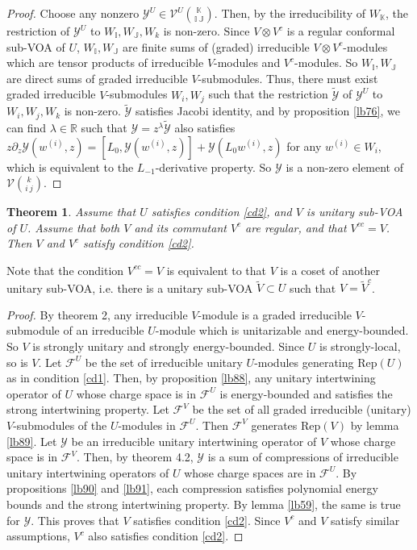 \documentclass[12pt,a4paper]{article}
\theoremstyle{definition}
\theoremstyle{plain}
\newtheorem{thm}[df]{Theorem}
\newcommand{\mc}{\mathcal}
\newcommand{\wtd}{\widetilde}
\newcommand{\Rep}{\mathrm{Rep}}
\newcommand{\mbb}{\mathbb}
\numberwithin{equation}{subsection}
\begin{document}
\begin{proof}
Choose any nonzero $\mc Y^U\in\mc V^U{\mbb K\choose \mbb I~\mbb J}$. Then, by the irreducibility of $W_{\mbb K}$, the restriction of $\mc Y^U$ to $W_{\mbb I},W_{\mbb J},W_k$ is non-zero. Since $V\otimes V^c$ is a regular conformal sub-VOA of $U$,   $W_{\mbb I},W_{\mbb J}$ are finite sums of (graded) irreducible $V\otimes V^c$-modules which are tensor products of irreducible $V$-modules and $V^c$-modules. So $W_{\mbb I},W_{\mbb J}$ are direct sums of graded irreducible $V$-submodules. Thus, there must exist graded irreducible $V$-submodules $W_i,W_j$ such that the restriction $\wtd{\mc Y}$ of $\mc Y^U$ to $W_i,W_j,W_k$ is non-zero. $\wtd{\mc Y}$ satisfies Jacobi identity, and by proposition \ref{lb76}, we can find $\lambda\in\mbb R$ such that $\mc Y=z^\lambda\wtd{\mc Y}$ also satisfies $z\partial_z\mc Y(w^{(i)},z)=[L_0,\mc Y(w^{(i)},z)]+\mc Y(L_0w^{(i)},z)$ for any $w^{(i)}\in W_i$, which is equivalent to the $L_{-1}$-derivative property. So $\mc Y$ is a non-zero element of $\mc V{k\choose i~j}$.
\end{proof}

\begin{thm}\label{lb92}
Assume that $U$ satisfies condition \ref{cd2}, and $V$ is  unitary sub-VOA of $U$. Assume that both $V$ and its commutant $V^c$ are regular, and that $V^{cc}=V$. Then $V$ and $V^c$ satisfy condition \ref{cd2}.
\end{thm}
Note that the condition $V^{cc}=V$ is equivalent to that $V$ is a coset of another unitary sub-VOA, i.e. there is a unitary sub-VOA $\wtd V\subset U$ such that $V=\wtd V^c$.



\begin{proof}
By \cite{KM15} theorem 2, any irreducible $V$-module is a graded irreducible $V$-submodule of an irreducible $U$-module which is unitarizable and energy-bounded. So $V$ is strongly unitary and strongly energy-bounded. Since $U$ is strongly-local, so is $V$. Let $\mc F^U$ be the set of irreducible unitary $U$-modules generating $\Rep(U)$ as in condition \ref{cd1}. Then, by proposition \ref{lb88}, any unitary intertwining operator of $U$ whose charge space is in $\mc F^U$ is energy-bounded and satisfies the strong intertwining property. Let $\mc F^V$ be the set of all graded irreducible (unitary) $V$-submodules of the $U$-modules in $\mc F^U$. Then $\mc F^V$ generates $\Rep(V)$ by lemma \ref{lb89}. Let $\mc Y$ be an irreducible unitary intertwining operator of $V$ whose charge space is in $\mc F^V$. Then, by \cite{Gui20a} theorem 4.2, $\mc Y$ is a sum of  compressions of  irreducible unitary intertwining operators of $U$ whose charge spaces are in $\mc F^U$. By propositions \ref{lb90} and  \ref{lb91}, each compression satisfies polynomial energy bounds and  the strong intertwining property. By lemma \ref{lb59}, the same is true for $\mc Y$. This proves that $V$ satisfies condition \ref{cd2}. Since $V^c$ and $V$ satisfy similar assumptions,  $V^c$ also satisfies condition \ref{cd2}.
\end{proof}
\end{document}

